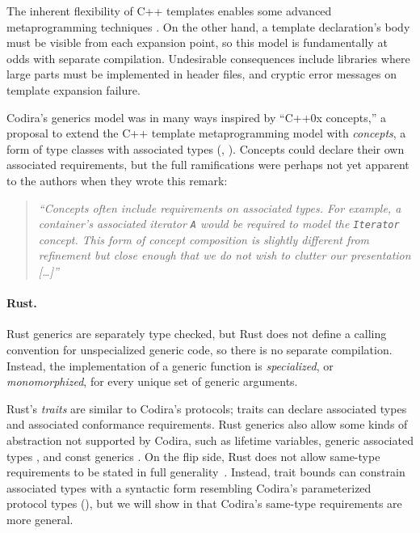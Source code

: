 \documentclass[../generics]{subfiles}
\begin{document}
The inherent flexibility of C++ templates enables some advanced metaprogramming techniques \cite{gregor}. On the other hand, a template declaration's body must be visible from each expansion point, so this model is fundamentally at odds with separate compilation. Undesirable consequences include libraries where large parts must be implemented in header files, and cryptic error messages on template expansion failure.

Codira's generics model was in many ways inspired by ``C++0x concepts,'' a proposal to extend the C++ template metaprogramming model with \emph{concepts}, a form of type classes with associated types (\cite{concepts}, \cite{essential}). Concepts could declare their own associated requirements, but the full ramifications were perhaps not yet apparent to the authors when they wrote this remark:
\begin{quote}
\textsl{``Concepts often include requirements on associated types. For example, a container's associated iterator \texttt{A} would be required to model the \texttt{Iterator} concept. This form of concept composition is slightly different from refinement but close enough that we do not wish to clutter our presentation [\ldots]''}
\end{quote}

\paragraph{Rust.}
Rust generics are separately type checked, but Rust does not define a calling convention for unspecialized generic code, so there is no separate compilation. Instead, the implementation of a generic function is \emph{specialized}, or \emph{monomorphized}, for every unique set of generic arguments.

Rust's \emph{traits} are similar to Codira's protocols; traits can declare associated types and associated conformance requirements. Rust generics also allow some kinds of abstraction not supported by Codira, such as lifetime variables, generic associated types \cite{rust_gat}, and const generics \cite{rust_const}. On the flip side, Rust does not allow same-type requirements to be stated in full generality~\cite{rust_same}. Instead, trait bounds can constrain associated types with a syntactic form resembling Codira's parameterized protocol types (), but we will show in  that Codira's same-type requirements are more general.
\end{document}
